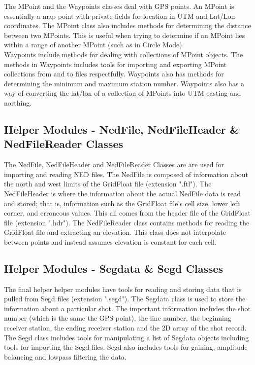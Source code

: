 \documentclass[12pt]{article}
\begin{document}
The MPoint and the Waypoints classes deal with GPS points. An MPoint is essentially a map point with private fields for location in UTM and Lat/Lon coordinates. The MPoint class also includes methods for determining the distance between two MPoints. This is useful when trying to determine if an MPoint lies within a range of another MPoint (such as in Circle Mode). \\

Waypoints include methods for dealing with collections of MPoint objects. The methods in Waypoints includes tools for importing and exporting MPoint collections from and to files respectfully. Waypoints also has methods for determining the minimum and maximum station number. Waypoints also has a way of converting the lat/lon of a collection of MPoints into UTM easting and northing. 

\subsection{Helper Modules - NedFile, NedFileHeader \& NedFileReader Classes}

The NedFile, NedFileHeader and NedFileReader Classes are are used for importing and reading NED files. The NedFile is composed of information about the north and west limits of the GridFloat file (extension ".ftl"). The NedFileHeader is where the information about the actual NedFile data is read and stored; that is, information such as the GridFloat file's cell size, lower left corner, and erroneous values. This all comes from the header file of the GridFloat file (extension ".hdr"). The NedFileReader class contains methods for reading the GridFloat file and extracting an elevation. This class does not interpolate between points and instead assumes elevation is constant for each cell. 

\subsection{Helper Modules - Segdata \& Segd Classes}

The final helper helper modules have tools for reading and storing data that is pulled from Segd files (extension ".segd"). The Segdata class is used to store the information about a particular shot. The important information includes the shot number (which is the same the GPS point), the line number, the beginning receiver station, the ending receiver station and the 2D array of the shot record. The Segd class includes tools for manipulating a list of Segdata objects including tools for importing the Segd files. Segd also includes tools for gaining, amplitude balancing and lowpass filtering the data.  
\end{document}
